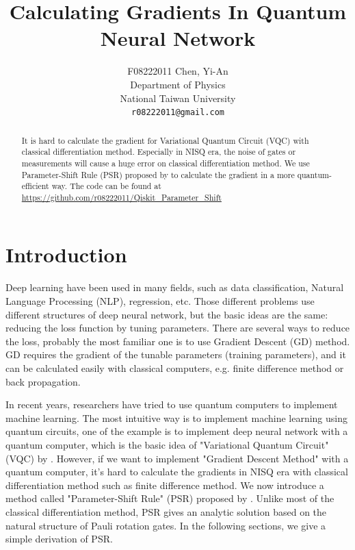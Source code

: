 \documentclass{article}
\title{Calculating Gradients In Quantum Neural Network}
\author{F08222011 Chen, Yi-An\\
	Department of Physics\\
	National Taiwan University\\
	\texttt{r08222011@gmail.com} \\
}
\date{}
\begin{document}
\maketitle

\begin{abstract}
    
    It is hard to calculate the gradient for Variational Quantum Circuit (VQC) with classical differentiation method. Especially in NISQ era, the noise of gates or measurements will cause a huge error on classical differentiation method. We use Parameter-Shift Rule (PSR) proposed by \citet{1905.13311} to calculate the gradient in a more quantum-efficient way. The code can be found at \url{https://github.com/r08222011/Qiskit\_Parameter\_Shift}
    
\end{abstract}




\section{Introduction}
Deep learning have been used in many fields, such as data classification, Natural Language Processing (NLP), regression, etc. Those different problems use different structures of deep neural network, but the basic ideas are the same: reducing the loss function by tuning parameters. There are several ways to reduce the loss, probably the most familiar one is to use Gradient Descent (GD) method. GD requires the gradient of the tunable parameters (training parameters), and it can be calculated easily with classical computers, e.g. finite difference method or back propagation.

In recent years, researchers have tried to use quantum computers to implement machine learning. The most intuitive way is to implement machine learning using quantum circuits, one of the example is to implement deep neural network with a quantum computer, which is the basic idea of "Variational Quantum Circuit" (VQC) by \citet{VQE}. However, if we want to implement "Gradient Descent Method" with a quantum computer, it's hard to calculate the gradients in NISQ era with classical differentiation method such as finite difference method. We now introduce a method called "Parameter-Shift Rule" (PSR) proposed by \citet{1905.13311}. Unlike most of the classical differentiation method, PSR gives an analytic solution based on the natural structure of Pauli rotation gates. In the following sections, we give a simple derivation of PSR.
\end{document}
